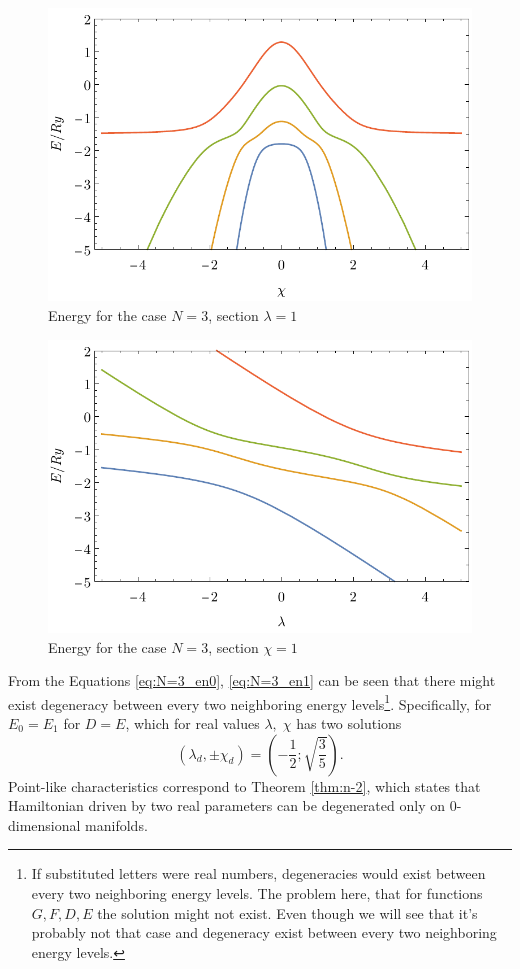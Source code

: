 \begin{figure}[H]
    \centering
    \includegraphics{../img/N=3_energiesl.pdf}
    \caption{Energy for the case $N=3$, section $\lambda=1$}
    \label{fig:N=3_energiesl}
\end{figure}
\begin{figure}[H]
    \centering
    \includegraphics{../img/N=3_energiesc.pdf}
    \caption{Energy for the case $N=3$, section $\chi=1$}
    \label{fig:N=3_energiesc}
\end{figure}

From the Equations \ref{eq:N=3_en0}, \ref{eq:N=3_en1} can be seen that there might exist degeneracy between every two neighboring energy levels\footnote{If substituted letters were real numbers, degeneracies would exist between every two neighboring energy levels. The problem here, that for functions $G,F,D,E$ the solution might not exist. Even though we will see that it's probably not that case and degeneracy exist between every two neighboring energy levels.}. Specifically, for $E_0=E_1$ for $D=E$, which for real values $\lambda,\;\chi$ has two solutions
$$(\lambda_d,\pm \chi_d)=\left(-\frac{1}{2};\sqrt{\frac{3}{5}}\right).$$
Point-like characteristics correspond to Theorem \ref{thm:n-2}, which states that Hamiltonian driven by two real parameters can be degenerated only on 0-dimensional manifolds. 

